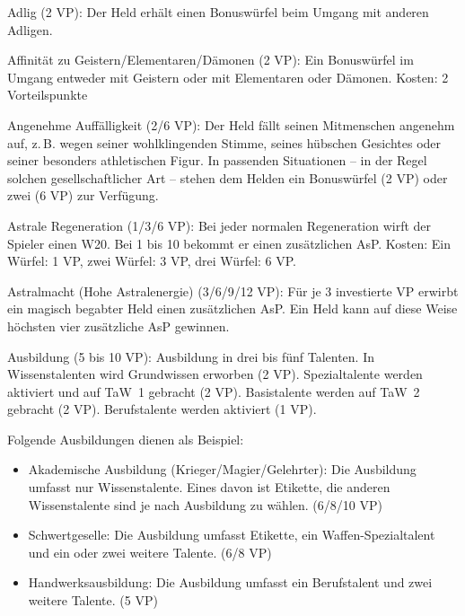 \begin{description}
\item{Adlig (2 VP):} Der Held erhält einen Bonuswürfel beim Umgang mit anderen Adligen.

\item{Affinität zu Geistern/Elementaren/Dämonen (2 VP):} Ein Bonuswürfel im Umgang entweder mit Geistern oder mit Elementaren oder Dämonen. Kosten: 2 Vorteilspunkte

\item{Angenehme Auffälligkeit (2/6 VP):} Der Held fällt seinen Mitmenschen angenehm auf, z.\,B. wegen seiner wohlklingenden Stimme, seines hübschen Gesichtes oder seiner besonders athletischen Figur. In passenden Situationen -- in der Regel solchen gesellschaftlicher Art -- stehen dem Helden ein Bonuswürfel (2 VP) oder zwei (6 VP) zur Verfügung.

\item{Astrale Regeneration (1/3/6 VP):} Bei jeder normalen Regeneration wirft der Spieler einen W20. Bei 1 bis 10 bekommt er einen zusätzlichen AsP. Kosten: Ein Würfel: 1 VP, zwei Würfel: 3 VP, drei Würfel: 6 VP.

\item{Astralmacht (Hohe Astralenergie) (3/6/9/12 VP):}
Für je 3 investierte VP erwirbt ein magisch begabter Held einen zusätzlichen AsP. Ein Held kann auf diese Weise höchsten vier zusätzliche AsP gewinnen.

\item{Ausbildung (5 bis 10 VP):} Ausbildung in drei bis fünf Talenten. In Wissenstalenten wird Grundwissen erworben (2 VP). Spezialtalente werden aktiviert und auf TaW~1 gebracht (2 VP). Basistalente werden auf TaW~2 gebracht (2 VP). Berufstalente werden aktiviert (1 VP).

Folgende Ausbildungen dienen als Beispiel:
\begin{itemize}
\item Akademische Ausbildung (Krieger/Magier/Gelehrter): Die Ausbildung umfasst nur Wissenstalente. Eines davon ist Etikette, die anderen Wissenstalente sind je nach Ausbildung zu wählen. (6/8/10 VP)
\item Schwertgeselle: Die Ausbildung umfasst Etikette, ein Waffen-Spezialtalent und ein oder zwei weitere Talente. (6/8 VP)
\item Handwerksausbildung: Die Ausbildung umfasst ein Berufstalent und zwei weitere Talente. (5 VP)
\end{itemize}


\end{description}
